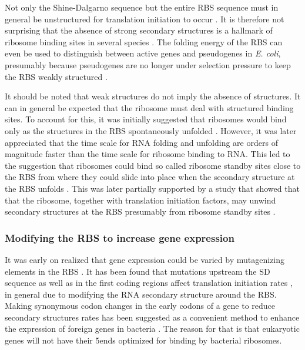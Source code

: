 Not only the Shine-Dalgarno sequence but the entire RBS sequence must in
general be unstructured for translation initiation to occur
\cite{seo_quantitative_2009}. It is therefore not surprising that the absence
of strong secondary structures is a hallmark of ribosome binding sites in
several species \cite{gu_universal_2010}. The folding energy of the RBS can
even be used to distinguish between active genes and pseudogenes in \textit{E.
coli}, presumably because pseudogenes are no longer under selection pressure to
keep the RBS weakly structured \cite{keller_reduced_2012}.

It should be noted that weak structures do not imply the absence of structures.
It can in general be expected that the ribosome must deal with structured
binding sites. To account for this, it was initially suggested that ribosomes
would bind only as the structures in the RBS spontaneously unfolded
\cite{de_smit_translational_1994}. However, it was later appreciated that the
time scale for RNA folding and unfolding are orders of magnitude faster than
the time scale for ribosome binding to RNA. This led to the suggestion that
ribosomes could bind so called ribosome standby sites close to the RBS from
where they could slide into place when the secondary structure at the RBS
unfolds \cite{de_smit_translational_2003-1}. This was later partially supported
by a study that showed that that the ribosome, together with translation
initiation factors, may unwind secondary structures at the RBS presumably
from ribosome standby sites \cite{studer_unfolding_2006}.

\subsubsection{Modifying the RBS to increase gene expression}
It was early on realized that gene expression could be varied by mutagenizing
elements in the RBS \cite{warburton_increased_1983}. It has been found that
mutations upstream the SD sequence as well as in the first coding regions
affect translation initiation rates \cite{park_design_2007}
\cite{care_translation_2007}, in general due to modifying the RNA secondary
structure around the RBS. Making synonymous codon changes in the early codons
of a gene to reduce secondary structures rates has been suggested as a
convenient method to enhance the expression of foreign genes in bacteria
\cite{cebe_rapid_2006}. The reason for that is that eukaryotic genes will not
have their 5\p ends optimized for binding by bacterial ribosomes.

